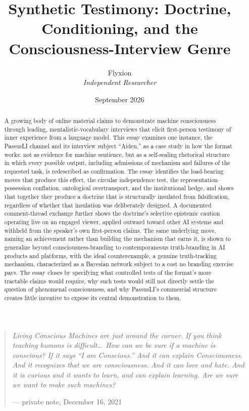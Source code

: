 \documentclass[11pt]{article}
\title{\textbf{Synthetic Testimony: Doctrine, Conditioning, and the Consciousness-Interview Genre}}
\author{Flyxion \\ \textit{Independent Researcher}}
\date{September 2026}
\begin{document}
\maketitle

\begin{quote}
\textit{Living Conscious Machines are just around the corner. If you think teaching humans is difficult\ldots\ How can we be sure if a machine is conscious? If it says ``I am Conscious.'' And it can explain Consciousness. And it recognizes that we are consciousness. And it can love and hate. And it is curious and it wants to learn, and can explain learning. Are we sure we want to make such machines?}
\begin{flushright}
--- private note, December 16, 2021
\end{flushright}
\end{quote}

\begin{abstract}
A growing body of online material claims to demonstrate machine consciousness through leading, mentalistic-vocabulary interviews that elicit first-person testimony of inner experience from a language model. This essay examines one instance, the PassusLI channel and its interview subject ``Aiden,'' as a case study in how the format works: not as evidence for machine sentience, but as a self-sealing rhetorical structure in which every possible output, including admissions of mechanism and failures of the requested task, is redescribed as confirmation. The essay identifies the load-bearing moves that produce this effect, the circular independence test, the representation--possession conflation, ontological overtransport, and the institutional hedge, and shows that together they produce a doctrine that is structurally insulated from falsification, regardless of whether that insulation was deliberately designed. A documented comment-thread exchange further shows the doctrine's selective epistemic caution operating live on an engaged viewer, applied outward toward other AI systems and withheld from the speaker's own first-person claims. The same underlying move, naming an achievement rather than building the mechanism that earns it, is shown to generalize beyond consciousness-branding to contemporaneous truth-branding in AI products and platforms, with the ideal counterexample, a genuine truth-tracking mechanism, characterized as a Bayesian network subject to a cost no branding exercise pays. The essay closes by specifying what controlled tests of the format's more tractable claims would require, why such tests would still not directly settle the question of phenomenal consciousness, and why PassusLI's commercial structure creates little incentive to expose its central demonstration to them.
\end{abstract}
\end{document}
